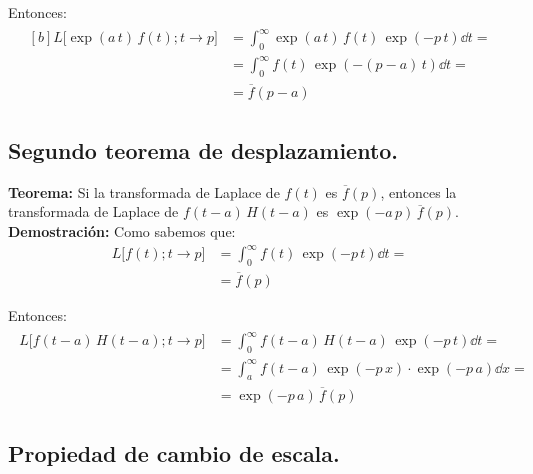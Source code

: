 Entonces:
\begin{align}
\begin{aligned}[b]
L \big[\exp (a \, t) \, f(t); t \to p\big] &= \int_{0}^{\infty} \exp(a \, t) \, f(t) \, \exp(-p \, t) \dd{t} = \\[0.5em]
&= \int_{0}^{\infty} f(t) \, \exp(-(p - a) \, t) \dd{t} = \\[0.5em]
&= \overline{f} (p - a)
\end{aligned}
\label{eq:ecuacion_03_07}
\end{align}

\subsection{Segundo teorema de desplazamiento.}

\noindent \textbf{Teorema: } Si la transformada de Laplace de $f(t)$ es $\overline{f}(p)$, entonces la transformada de Laplace de $f(t - a) \, H(t - a)$ es $\exp(-a \, p) \, \overline{f}(p)$.
\\[0.5em]
\textbf{Demostración: } 
Como sabemos que:
\begin{align*}
L \big[f(t); t \to p\big] &= \int_{0}^{\infty} f(t) \, \exp(-p \, t) \dd{t} = \\[0.5em]
&= \overline{f} (p)
\end{align*}

Entonces:
\begin{align}
\begin{aligned}
L \big[f(t - a) \, H (t - a); t \to p\big] &= \int_{0}^{\infty} f(t - a) \, H(t - a) \, \exp(-p \, t) \dd{t} = \\[0.5em]
&= \int_{a}^{\infty} f(t - a) \, \exp(-p \, x) \cdot \exp(-p \, a) \dd{x} = \\[0.5em]
&= \exp(-p \, a) \, \overline{f} (p) 
\end{aligned}
\label{eq:ecuacion_03_08}
\end{align}

\subsection{Propiedad de cambio de escala.}

